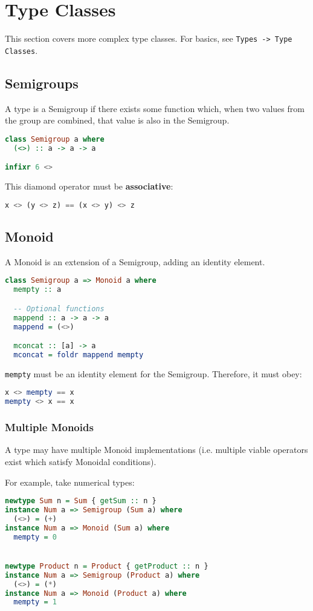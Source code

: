 \section{Type Classes}
This section covers more complex type classes. For basics, see \texttt{Types -> Type Classes}.

\subsection{Semigroups}
A type is a Semigroup if there exists some function which, when two values from the group are combined, that value is also in the Semigroup.

\begin{lstlisting}[language=haskell]
class Semigroup a where
  (<>) :: a -> a -> a

infixr 6 <>
\end{lstlisting}

This diamond operator must be \textbf{associative}:
\begin{lstlisting}[language=haskell]
x <> (y <> z) == (x <> y) <> z
\end{lstlisting}

\subsection{Monoid}
A Monoid is an extension of a Semigroup, adding an identity element.
\begin{lstlisting}[language=haskell]
class Semigroup a => Monoid a where
  mempty :: a

  -- Optional functions
  mappend :: a -> a -> a
  mappend = (<>)

  mconcat :: [a] -> a
  mconcat = foldr mappend mempty
\end{lstlisting}

\texttt{mempty} must be an identity element for the Semigroup. Therefore, it must obey:
\begin{lstlisting}[language=haskell]
x <> mempty == x
mempty <> x == x
\end{lstlisting}

\subsubsection{Multiple Monoids}
A type may have multiple Monoid implementations (i.e. multiple viable operators exist which satisfy Monoidal conditions).

For example, take numerical types:
\begin{lstlisting}[language=haskell]
newtype Sum n = Sum { getSum :: n }
instance Num a => Semigroup (Sum a) where
  (<>) = (+)
instance Num a => Monoid (Sum a) where
  mempty = 0


newtype Product n = Product { getProduct :: n }
instance Num a => Semigroup (Product a) where
  (<>) = (*)
instance Num a => Monoid (Product a) where
  mempty = 1

\end{lstlisting}

